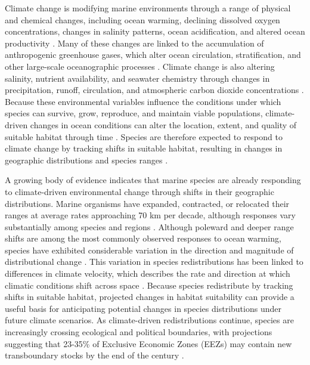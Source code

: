 \documentclass[12pt]{article}
\begin{document}
Climate change is modifying marine environments through a range of physical and chemical changes, including ocean warming, declining dissolved oxygen concentrations, changes in salinity patterns, ocean acidification, and altered ocean productivity \citep{Portner2007, Pecl2017}. Many of these changes are linked to the accumulation of anthropogenic greenhouse gases, which alter ocean circulation, stratification, and other large-scale oceanographic processes \citep{Portner2007}. Climate change is also altering salinity, nutrient availability, and seawater chemistry through changes in precipitation, runoff, circulation, and atmospheric carbon dioxide concentrations \citep{Portner2007}. Because these environmental variables influence the conditions under which species can survive, grow, reproduce, and maintain viable populations, climate-driven changes in ocean conditions can alter the location, extent, and quality of suitable habitat through time \citep{Portner2007, MeloMerino2020}. Species are therefore expected to respond to climate change by tracking shifts in suitable habitat, resulting in changes in geographic distributions and species ranges \citep{Pecl2017}.

A growing body of evidence indicates that marine species are already responding to climate-driven environmental change through shifts in their geographic distributions. Marine organisms have expanded, contracted, or relocated their ranges at average rates approaching 70 km per decade, although responses vary substantially among species and regions \citep{Pecl2017, Pinsky2018}. Although poleward and deeper range shifts are among the most commonly observed responses to ocean warming, species have exhibited considerable variation in the direction and magnitude of distributional change \citep{Pecl2017, Pinsky2013}. This variation in species redistributions has been linked to differences in climate velocity, which describes the rate and direction at which climatic conditions shift across space \citep{Pinsky2013}. Because species redistribute by tracking shifts in suitable habitat, projected changes in habitat suitability can provide a useful basis for anticipating potential changes in species distributions under future climate scenarios. As climate-driven redistributions continue, species are increasingly crossing ecological and political boundaries, with projections suggesting that 23-35\% of Exclusive Economic Zones (EEZs) may contain new transboundary stocks by the end of the century \citep{Pinsky2018}.
\end{document}
